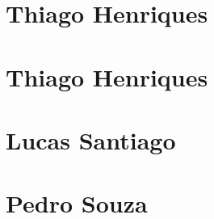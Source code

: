 \documentclass[
  article,			       %
  12pt,				         %
  oneside,			       %
  a4paper,			       %
  english,		       	 %
  brazil,			      	 %
  sumario=tradicional
]{abntex2}
\begin{document}
\begin{apendicesenv}
        \newpage
        \chapter{Thiago Henriques}

        \newpage

        \chapter{Thiago Henriques}

        \newpage 

        \chapter{Lucas Santiago}

        \newpage

        \chapter{Pedro Souza}




    
    \end{apendicesenv}
\end{document}
